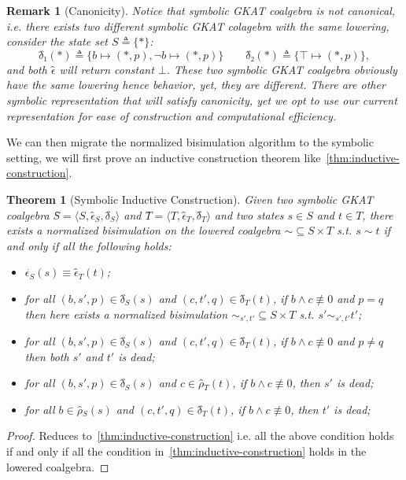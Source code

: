 \documentclass{extarticle}
\newtheorem{theorem}{Theorem}
\newtheorem{remark}[definition]{Remark}
\begin{document}
\begin{remark}[Canonicity]
    Notice that symbolic GKAT coalgebra is not canonical, i.e. there exists two different symbolic GKAT colagebra with the same lowering, consider the state set \(S ≜ \{*\}\):
    \[{δ̂}₁(*) ≜ \{b ↦ (*, p), ¬ b ↦ (*, p)\} \qquad 
    {δ̂}₂(*) ≜ \{⊤ ↦ (*, p)\},\] 
    and both \(ϵ̂\) will return constant \(⊥\).
    These two symbolic GKAT coalgebra obviously have the same lowering hence behavior, yet, they are different.
    There are other symbolic representation that will satisfy canonicity, yet we opt to use our current representation for ease of construction and computational efficiency.
\end{remark}

We can then migrate the normalized bisimulation algorithm to the symbolic setting, we will first prove an inductive construction theorem like~\cref{thm:inductive-construction}.

\begin{theorem}[Symbolic Inductive Construction]\label{thm:symb-inductive-construction}
    Given two symbolic GKAT coalgebra \(Ŝ = ⟨S, ϵ̂_S, δ̂_S⟩\) and \(T̂ = ⟨T, ϵ̂_T, δ̂_T⟩\) and two states \(s ∈ S\) and \(t ∈ T\), there exists a normalized bisimulation on the lowered coalgebra \({∼} ⊆ S × T\) s.t. \(s ∼ t\) if and only if all the following holds:
    \begin{itemize}
        \item \(ϵ̂_S(s) ≡ ϵ̂_T(t)\);
        \item for all \((b, s', p) ∈ δ̂_S(s)\) and \((c, t', q) ∈ δ̂_T(t)\), if \(b ∧ c ≢ 0\) and \(p = q\) then here exists a normalized bisimulation \({∼_{s',t'}} ⊆ S × T\) s.t. \(s' ∼_{s',t'} t'\);
        \item for all \((b, s', p) ∈ δ̂_S(s)\) and \((c, t', q) ∈ δ̂_T(t)\), if \(b ∧ c ≢ 0\) and \(p ≠ q\) then both \(s'\) and \(t'\) is dead;  
        \item for all \((b, s', p) ∈ δ̂_S(s)\) and \(c ∈ ρ̂_T(t)\), if \(b ∧ c ≢ 0\), then \(s'\) is dead;
        \item for all \(b ∈ ρ̂_S(s)\) and \((c, t', q) ∈ δ̂_T(t)\), if \(b ∧ c ≢ 0\), then \(t'\) is dead;
    \end{itemize}
\end{theorem}

\begin{proof}
    Reduces to~\cref{thm:inductive-construction} i.e. all the above condition holds if and only if all the condition in~\cref{thm:inductive-construction} holds in the lowered coalgebra.
\end{proof}
\end{document}

